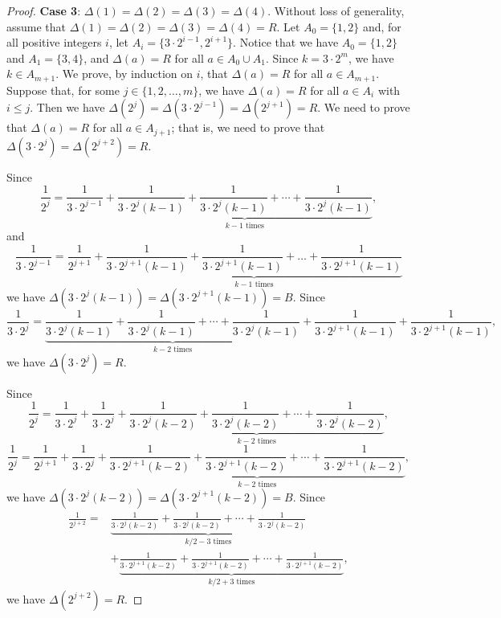 \documentclass[11pt]{article}
\theoremstyle{definition}
\begin{document}
\begin{proof}
\textbf{Case 3}: $\Delta(1)=\Delta(2)=\Delta(3)=\Delta(4)$. Without loss of generality, assume that $\Delta(1)=\Delta(2)=\Delta(3)=\Delta(4)=R$. Let $A_0=\{1,2\}$ and, for all positive integers $i$, let $A_i=\{3\cdot2^{i-1},2^{i+1}\}$. Notice that we have $A_0=\{1,2\}$ and $A_1=\{3,4\}$, and $\Delta(a)=R$ for all $a\in A_0\cup A_1$. Since $k=3\cdot2^m$, we have $k\in A_{m+1}$. We prove, by induction on $i$, that $\Delta(a)=R$ for all $a\in A_{m+1}$. Suppose that, for some $j\in\{1,2,\ldots,m\}$, we have $\Delta(a)=R$ for all $a\in A_i$ with $i\leq j$. Then we have $\Delta(2^j)=\Delta(3\cdot2^{j-1})=\Delta(2^{j+1})=R$. We need to prove that $\Delta(a)=R$ for all $a\in A_{j+1}$; that is, we need to prove that $\Delta(3\cdot2^j)=\Delta(2^{j+2})=R$.

Since
\begin{equation}\label{Identity:1}
    \frac{1}{2^j}=\frac{1}{3\cdot2^{j-1}}+\underbrace{\frac{1}{3\cdot2^{j}(k-1)}+\frac{1}{3\cdot2^{j}(k-1)}+\cdots+\frac{1}{3\cdot2^{j}(k-1)}}_{k-1\text{ times}},
\end{equation}
and
\begin{equation}\label{Identity:2}
    \frac{1}{3\cdot2^{j-1}}=\frac{1}{2^{j+1}}+\underbrace{\frac{1}{3\cdot2^{j+1}(k-1)}+\frac{1}{3\cdot2^{j+1}(k-1)}+\ldots+\frac{1}{3\cdot2^{j+1}(k-1)}}_{k-1\text{ times}}
\end{equation}
we have $\Delta(3\cdot2^{j}(k-1))=\Delta(3\cdot2^{j+1}(k-1))=B$. Since
\begin{equation}\label{Identity:3}
    \frac{1}{3\cdot2^j}=\underbrace{\frac{1}{3\cdot2^j(k-1)}+\frac{1}{3\cdot2^j(k-1)}+\cdots+\frac{1}{3\cdot2^j(k-1)}}_{k-2\text{ times}}+\frac{1}{3\cdot2^{j+1}(k-1)}+\frac{1}{3\cdot2^{j+1}(k-1)},
\end{equation}
we have $\Delta(3\cdot2^j)=R$. 

Since
\begin{equation}\label{Identity:4}
\frac{1}{2^j}=\frac{1}{3\cdot2^{j}}+\frac{1}{3\cdot2^{j}}+\underbrace{\frac{1}{3\cdot2^{j}(k-2)}+\frac{1}{3\cdot2^{j}(k-2)}+\cdots+\frac{1}{3\cdot2^{j}(k-2)}}_{k-2\text{ times}},
\end{equation}
\begin{equation}\label{Identity:5}
    \frac{1}{2^{j}}=\frac{1}{2^{j+1}}+\frac{1}{3\cdot2^{j}}+\underbrace{\frac{1}{3\cdot2^{j+1}(k-2)}+\frac{1}{3\cdot2^{j+1}(k-2)}+\cdots+\frac{1}{3\cdot2^{j+1}(k-2)}}_{k-2\text{ times}},
\end{equation}
we have $\Delta(3\cdot2^{j}(k-2))=\Delta(3\cdot2^{j+1}(k-2))=B$. Since
\begin{equation}\label{Identity:6}
    \begin{split}
    \frac{1}{2^{j+2}}=&\underbrace{\frac{1}{3\cdot2^{j}(k-2)}+\frac{1}{3\cdot2^{j}(k-2)}+\cdots+\frac{1}{3\cdot2^{j}(k-2)}}_{k/2-3\text{ times}}\\&+\underbrace{\frac{1}{3\cdot2^{j+1}(k-2)}+\frac{1}{3\cdot2^{j+1}(k-2)}+\cdots+\frac{1}{3\cdot2^{j+1}(k-2)}}_{k/2+3\text{ times}},
\end{split}
\end{equation}
we have $\Delta(2^{j+2})=R$.


\end{proof}
\end{document}
